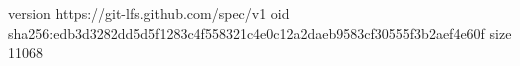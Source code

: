 version https://git-lfs.github.com/spec/v1
oid sha256:edb3d3282dd5d5f1283c4f558321c4e0c12a2daeb9583cf30555f3b2aef4e60f
size 11068
